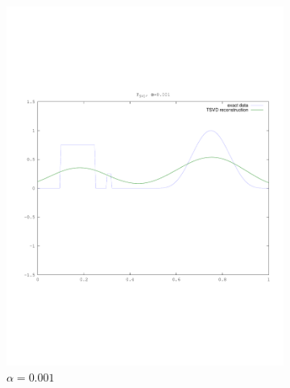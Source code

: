 \documentclass{article}
\begin{document}
\begin{figure}[!htb]
\begin{subfigure}[bh]{0.45\textwidth}
                \includegraphics[width=\textwidth]{plots/tsvd001.pdf}
                \caption{$\alpha=0.001$}
        \end{subfigure}
        \centering
        \begin{subfigure}[bh]{0.45\textwidth}

\end{subfigure}
\end{figure}
\end{document}
